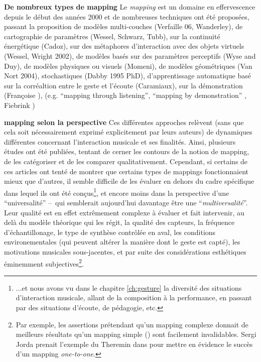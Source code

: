 \par{\textbf{De nombreux types de mapping}} Le \textit{mapping} est un domaine en effervescence depuis le début des années 2000 et de nombreuses techniques ont été proposées, passant la proposition de modèles multi-couches (Verfaille 06, Wanderley), de cartographie de paramètres (Wessel, Schwarz, Tubb), sur la continuité énergétique (Cadoz), sur des métaphores d'interaction avec des objets virtuels (Wessel, Wright 2002), de modèles basés sur des paramètres perceptifs (Wyse and Duy), de modèles physiques ou visuels (Momeni), de modèles géométriques (Van Nort 2004), stochastiques (Dabby 1995 PhD), d'apprentissage automatique basé sur la corréaltion entre le geste et l'écoute (Caramiaux), sur la démonstration (Françoise ), (e.g. ``mapping through listening''\cite{caramiaux_mapping_2014}, ``mapping by demonstration'' \cite{francoise_motion-sound_2015}, Fiebrink \cite{fiebrink_real-time_2011})

\par{\textbf{mapping selon la perspective}} Ces différentes approches relèvent (sans que cela soit nécessairement exprimé explicitement par leurs auteurs) de dynamiques différentes concernant l'interaction musicale et ses finalités. Ainsi, plusieurs études ont été publiées, tentant de cerner les contours de la notion de mapping, de les catégoriser et de les comparer qualitativement. Cependant, si certains de ces articles ont tenté de montrer que certains types de mappings fonctionnaient mieux que d'autres, il semble difficile de les évaluer en dehors du cadre spécifique dans lequel ils ont été conçus\footnote{...et nous avons vu dans le chapitre \ref{ch:gesture} la diversité des situations d'interaction musicale, allant de la composition à la performance, en passant par des situations d'écoute, de pédagogie, etc.}, et encore moins dans la perspective d'une ``universalité'' --~qui semblerait aujourd'hui davantage être une ``\textit{multiversalité}''. Leur qualité est en effet extrêmement complexe à évaluer et fait intervenir, au delà du modèle théorique qui les régit, la qualité des capteurs, la fréquence d'échantillonage, le type de synthèse contrôlée en aval, les conditions environementales (qui peuvent altérer la manière dont le geste est capté), les motivations musicales sous-jacentes, et par suite des considérations esthétiques éminemment subjectives\footnote{Par exemple, les assertions prétendant qu'un mapping complexe donnait de meilleurs résultats qu'un mapping simple (\cite{rovan_instrumental_1997, hunt_mapping_2000}) sont facilement invalidables. Sergi Jorda prenait l'exemple du Theremin dans \cite{Jorda-phd} pour mettre en évidence le succès d'un mapping \textit{one-to-one}.}.

